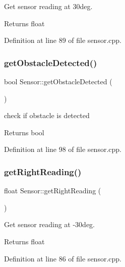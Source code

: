 Get sensor reading at 30deg. 

\begin{DoxyReturn}{Returns}
float 
\end{DoxyReturn}


Definition at line 89 of file sensor.\+cpp.

\mbox{\label{class_sensor_af590a94a155718952a71ee842a0db661}} 
\subsubsection{\texorpdfstring{get\+Obstacle\+Detected()}{getObstacleDetected()}}
{\footnotesize\ttfamily bool Sensor\+::get\+Obstacle\+Detected (\begin{DoxyParamCaption}{ }\end{DoxyParamCaption})}



check if obstacle is detected 

\begin{DoxyReturn}{Returns}
bool 
\end{DoxyReturn}


Definition at line 98 of file sensor.\+cpp.

\mbox{\label{class_sensor_a784ee9b741908df505a51d0807dbbe9b}} 
\subsubsection{\texorpdfstring{get\+Right\+Reading()}{getRightReading()}}
{\footnotesize\ttfamily float Sensor\+::get\+Right\+Reading (\begin{DoxyParamCaption}{ }\end{DoxyParamCaption})}



Get sensor reading at -\/30deg. 

\begin{DoxyReturn}{Returns}
float 
\end{DoxyReturn}


Definition at line 86 of file sensor.\+cpp.

\mbox{\label{class_sensor_a1b7aad1c82fa6df205b166b311f45447}} 
